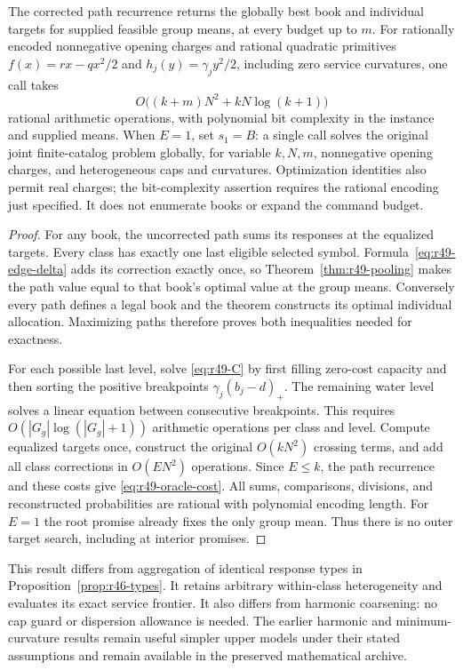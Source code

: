 \begin{theorem}\label{thm:r49-frontier}
The corrected path recurrence returns the globally best book and individual targets for supplied feasible group means, at every budget up to $m$. For rationally encoded nonnegative opening charges and rational quadratic primitives $f(x)=rx-qx^2/2$ and $h_j(y)=\gamma_jy^2/2$, including zero service curvatures, one call takes
\begin{equation}\label{eq:r49-oracle-cost}
 O\bigl((k+m)N^2+kN\log(k+1)\bigr)
\end{equation}
rational arithmetic operations, with polynomial bit complexity in the instance and supplied means. When $E=1$, set $s_1=B$: a single call solves the original joint finite-catalog problem globally, for variable $k,N,m$, nonnegative opening charges, and heterogeneous caps and curvatures. Optimization identities also permit real charges; the bit-complexity assertion requires the rational encoding just specified. It does not enumerate books or expand the command budget.
\end{theorem}
\begin{proof}
For any book, the uncorrected path sums its responses at the equalized targets. Every class has exactly one last eligible selected symbol. Formula~\eqref{eq:r49-edge-delta} adds its correction exactly once, so Theorem~\ref{thm:r49-pooling} makes the path value equal to that book's optimal value at the group means. Conversely every path defines a legal book and the theorem constructs its optimal individual allocation. Maximizing paths therefore proves both inequalities needed for exactness.

For each possible last level, solve \eqref{eq:r49-C} by first filling zero-cost capacity and then sorting the positive breakpoints $\gamma_j(b_j-d)_+$. The remaining water level solves a linear equation between consecutive breakpoints. This requires $O(|G_g|\log(|G_g|+1))$ arithmetic operations per class and level. Compute equalized targets once, construct the original $O(kN^2)$ crossing terms, and add all class corrections in $O(EN^2)$ operations. Since $E\leq k$, the path recurrence and these costs give \eqref{eq:r49-oracle-cost}. All sums, comparisons, divisions, and reconstructed probabilities are rational with polynomial encoding length. For $E=1$ the root promise already fixes the only group mean. Thus there is no outer target search, including at interior promises.\end{proof}

This result differs from aggregation of identical response types in Proposition~\ref{prop:r46-types}. It retains arbitrary within-class heterogeneity and evaluates its exact service frontier. It also differs from harmonic coarsening: no cap guard or dispersion allowance is needed. The earlier harmonic and minimum-curvature results remain useful simpler upper models under their stated assumptions and remain available in the preserved mathematical archive.
